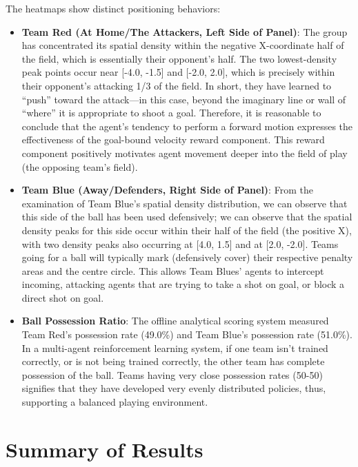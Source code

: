 The heatmaps show distinct positioning behaviors:
\begin{itemize}
    \item \textbf{Team Red (At Home/The Attackers, Left Side of Panel)}: The group has concentrated its spatial density within the negative X-coordinate half of the field, which is essentially their opponent’s half. The two lowest-density peak points occur near [-4.0, -1.5] and [-2.0, 2.0], which is precisely within their opponent’s attacking 1/3 of the field. In short, they have learned to “push” toward the attack—in this case, beyond the imaginary line or wall of “where” it is appropriate to shoot a goal. Therefore, it is reasonable to conclude that the agent’s tendency to perform a forward motion expresses the effectiveness of the goal-bound velocity reward component. This reward component positively motivates agent movement deeper into the field of play (the opposing team’s field).
    \item \textbf{Team Blue (Away/Defenders, Right Side of Panel)}: From the examination of Team Blue’s spatial density distribution, we can observe that this side of the ball has been used defensively; we can observe that the spatial density peaks for this side occur within their half of the field (the positive X), with two density peaks also occurring at [4.0, 1.5] and at [2.0, -2.0]. Teams going for a ball will typically mark (defensively cover) their respective penalty areas and the centre circle. This allows Team Blues’ agents to intercept incoming, attacking agents that are trying to take a shot on goal, or block a direct shot on goal.
    \item \textbf{Ball Possession Ratio}: The offline analytical scoring system measured Team Red’s possession rate (49.0\%) and Team Blue’s possession rate (51.0\%). In a multi-agent reinforcement learning system, if one team isn't trained correctly, or is not being trained correctly, the other team has complete possession of the ball. Teams having very close possession rates (50-50) signifies that they have developed very evenly distributed policies, thus, supporting a balanced playing environment.
\end{itemize}

\section{Summary of Results}
\label{sec:results-summary}

